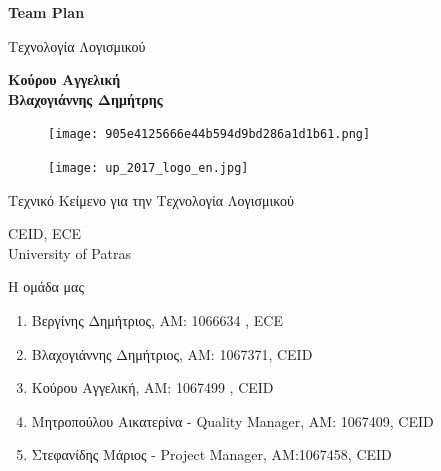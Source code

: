 \documentclass{article}
\begin{document}
\begin{titlepage}
   \begin{center}
       \vspace*{1cm}

       \textbf{\huge Team Plan}

       \vspace{0.5cm}
        Τεχνολογία Λογισμικού
            
       \vspace{1cm}

       \textbf{Κούρου Αγγελική\\Βλαχογιάννης Δημήτρης}
       
       \begin{figure}[!htb]
        \centering
        \texttt{[image: 905e4125666e44b594d9bd286a1d1b61.png]}
        \end{figure}
        
        \vspace{0.5cm}
        
        \begin{figure}[!htb]
        \centering
        \texttt{[image: up\_2017\_logo\_en.jpg]}
        \end{figure}


       \vfill
            
       Τεχνικό Κείμενο για την Τεχνολογία Λογισμικού\\
            
       \vspace{0.5cm}
            
        CEID, ECE \\
       University of Patras\\
            
   \end{center}
\end{titlepage}



\noindent Η ομάδα μας

\begin{enumerate}
  \item Βεργίνης Δημήτριος, ΑΜ: 1066634 , ECE
  \item Βλαχογιάννης Δημήτριος, ΑΜ: 1067371, CEID
  \item Κούρου Αγγελική, ΑΜ: 1067499 , CEID
  \item Μητροπούλου Αικατερίνα - Quality Manager, ΑΜ: 1067409, CEID
  \item Στεφανίδης Μάριος - Project Manager, ΑΜ:1067458, CEID
\end{enumerate}
\end{document}
